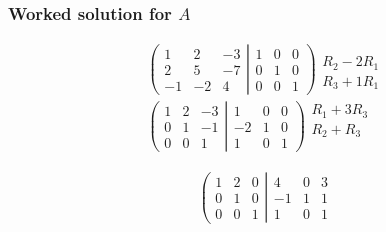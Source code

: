 \documentclass[usenames,dvipsnames,aspectratio=169,10pt]{beamer}
\numberwithin{equation}{section}
\begin{document}
\begin{frame}
\frametitle{Worked solution for $A$}

\begin{minipage}{0.48\textwidth}
\begin{align*}
&
\left(
	\begin{matrix}
	  1 &  2 & -3 \\
	  2 &  5 & -7 \\
	 -1 & -2 &  4
	\end{matrix}
  \left|
	\begin{matrix}
		1 &  0 &  0 \\
		0 &  1 &  0 \\
		0 &  0 &  1
	\end{matrix}
  \right.
\right)
\begin{array}{l}
   \\
 R_2 - 2R_1 \\
 R_3 + 1R_1
\end{array}
\\
&
\left(
	\begin{matrix}
	  1 &  2 & -3 \\
	  0 &  1 & -1 \\
	  0 &  0 &  1
	\end{matrix}
  \left|
	\begin{matrix}
		 1 &  0 &  0 \\
		-2 &  1 &  0 \\
		 1 &  0 &  1
	\end{matrix}
  \right.
\right)
\begin{array}{l}
  R_1 + 3R_3 \\
  R_2 +  R_3 \\
   \\
\end{array}
\end{align*}
\end{minipage}\hfill
\begin{minipage}{0.48\textwidth}
\begin{align*}
&
\left(
	\begin{matrix}
	  1 &  2 &  0 \\
	  0 &  1 &  0 \\
	  0 &  0 &  1
	\end{matrix}
  \left|
	\begin{matrix}
		 4 &  0 &  3 \\
		-1 &  1 &  1 \\
		 1 &  0 &  1
	\end{matrix}

\end{align*}
\end{minipage}
\end{frame}
\end{document}
